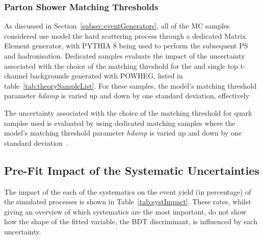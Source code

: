 \subsubsection{Parton Shower Matching Thresholds}
As discussed in Section~\ref{subsec:eventGenerators}, all of the MC samples considered use model the hard scattering process through a dedicated Matrix Element generator, with PYTHIA 8 being used to perform the subsequent PS and hadronisation.
Dedicated samples evaluate the impact of the uncertainty associated with the choice of the matching threshold for the \ttbar and single top t-channel backgrounds generated with POWHEG, listed in table~\ref{tab:theorySampleList}.
For these samples, the model's matching threshold parameter \emph{hdamp} is varied up and down by one standard deviation, effectively 

The uncertainty associated with the choice of the matching threshold for  quark samplse used is evaluated by using dedicated matching samples where the model's matching threshold parameter \emph{hdamp} is varied up and down by one standard deviation~\cite{CMS:2016kle}.

\subsection{Pre-Fit Impact of the Systematic Uncertainties}\label{sec:uncertainitiesPreFitImpact}
The impact of the each of the systematics on the event yield (in percentage) of the simulated processes is shown in Table~\ref{tab:systImpact}.
These rates, whilst giving an overview of which systematics are the most important, do not show how the shape of the fitted variable, the BDT discriminant, is influenced by each uncertainty.


